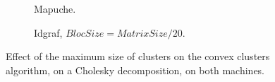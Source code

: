 \documentclass[10pt, conference, compsocconf,pdftex,dvipsnames]{IEEEtran}
\begin{document}

\begin{figure}[htb]
    \centering
    \begin{subfigure}{0.5\textwidth}
        \scalebox{0.65}{
            
        }
        \caption{Mapuche.}
        \label{fig:ClustersMapuche}
    \end{subfigure}
    \begin{subfigure}{0.5\textwidth}
        \scalebox{0.65}{
            
        }
        \caption{Idgraf, $BlocSize=MatrixSize/20$.}
        \label{fig:ClustersIdgraf}
    \end{subfigure}

    \caption{Effect of the maximum size of clusters on the convex clusters
    algorithm, on a Cholesky decomposition, on both machines.}
    \label{fig:Clusters}
\end{figure}


\end{document}
